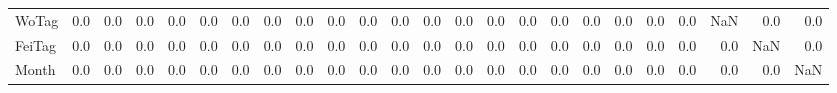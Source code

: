 \begin{tabular}{lrrrrrrrrrrrrrrrrrrrrrrr}
WoTag   &      0.0 &  0.0 &  0.0 &    0.0 &    0.0 &    0.0 &    0.0 &    0.0 &    0.0 &    0.0 &    0.0 &    0.0 &   0.0 &   0.0 &    0.0 &    0.0 &    0.0 &    0.0 &   0.0 &      0.0 &    NaN &     0.0 &    0.0 \\
FeiTag  &      0.0 &  0.0 &  0.0 &    0.0 &    0.0 &    0.0 &    0.0 &    0.0 &    0.0 &    0.0 &    0.0 &    0.0 &   0.0 &   0.0 &    0.0 &    0.0 &    0.0 &    0.0 &   0.0 &      0.0 &    0.0 &     NaN &    0.0 \\
Month   &      0.0 &  0.0 &  0.0 &    0.0 &    0.0 &    0.0 &    0.0 &    0.0 &    0.0 &    0.0 &    0.0 &    0.0 &   0.0 &   0.0 &    0.0 &    0.0 &    0.0 &    0.0 &   0.0 &      0.0 &    0.0 &     0.0 &    NaN \\
\bottomrule
\end{tabular}
